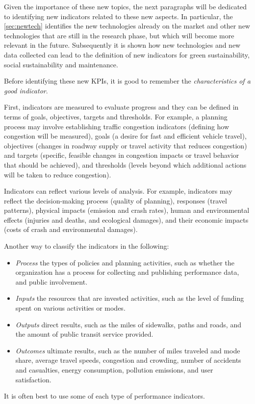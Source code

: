 Given the importance of these new topics, the next paragraphs will be dedicated to identifying new indicators related to these new aspects. In particular, the \ref{sec:newtech} identifies the new technologies already on the market and other new technologies that are still in the research phase, but which will become more relevant in the future. Subsequently it is shown how new technologies and new data collected can lead to the definition of new indicators for green sustainability, social sustainability and maintenance.

Before identifying these new KPIs, it is good to remember the \emph{characteristics of a good indicator}.

First, indicators are measured to evaluate progress and they can be defined in terms of goals, objectives, targets and thresholds. For example, a planning process may involve establishing traffic congestion indicators (defining how congestion will be measured), goals (a desire for fast and efficient vehicle travel), objectives (changes in roadway supply or travel activity that reduces congestion) and targets (specific, feasible changes in congestion impacts or travel behavior that should be achieved), and thresholds (levels beyond which additional actions will be taken to reduce congestion).

Indicators can reflect various levels of analysis. For example, indicators may reflect the decision-making process (quality of planning), responses (travel patterns), physical impacts (emission and crash rates), human and environmental effects (injuries and deaths, and ecological damages), and their economic impacts (costs of crash and environmental damages).

Another way to classify the indicators in the following:
\begin{itemize}
    \item \emph{Process} the types of policies and planning activities, such as whether the organization has a process for collecting and publishing performance data, and public involvement.
    \item \emph{Inputs} the resources that are invested activities, such as the level of funding spent on various activities or modes.
    \item \emph{Outputs} direct results, such as the miles of sidewalks, paths and roads, and the amount of public transit service provided.
    \item \emph{Outcomes} ultimate results, such as the number of miles traveled and mode share, average travel speeds, congestion and crowding, number of accidents and casualties, energy consumption, pollution emissions, and user satisfaction.
\end{itemize}
It is often best to use some of each type of performance indicators. 

